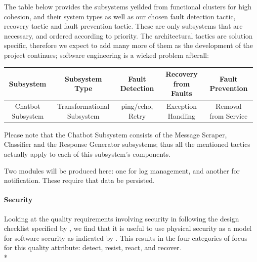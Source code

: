 \documentclass[11pt]{article}
\begin{document}
The table below provides the subsystems yeilded from functional clusters for high cohesion, and their system types as well as our chosen fault detection tactic, recovery tactic and fault prevention tactic. These are only subsystems that are necessary, and ordered according to priority. The architectural tactics are solution specific, therefore we expect to add many more of them as the development of the project continues; software engineering is a wicked problem afterall:

\begin{center}
	\hspace*{-1.2cm}\begin{tabular}{|c|c|c|c|c|}
		\hline
		Subsystem & Subsystem Type & Fault Detection & Recovery from Faults & Fault Prevention \\
		\hline
		Chatbot Subsystem & Transformational Subsystem & ping/echo, Retry & Exception Handling & Removal from Service\\
		\hline
	\end{tabular}	
\end{center}
Please note that the Chatbot Subsystem consists of the Message Scraper, Classifier and the Response Generator subsystems; thus all the mentioned tactics actually apply to each of this subsystem's components.

Two modules will be produced here: one for log management, and another for notification. These require that data be persisted.

\paragraph{Security}
Looking at the quality requirements involving security in following the design checklist specified by \cite{Book:1}, we find that it is useful to use physical security as a model for software security as indicated by \cite{Book:2}. This results in the four categories of focus for this quality attribute: detect, resist, react, and recover. \\*
\end{document}
